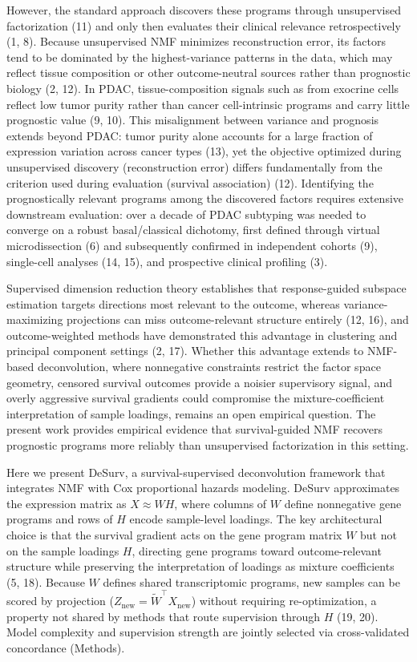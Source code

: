 \documentclass[9pt,twocolumn,twoside,]{pnas-new}
\begin{document}
However, the standard approach discovers these programs through
unsupervised factorization (11) and only then evaluates their clinical
relevance retrospectively (1, 8). Because unsupervised NMF minimizes
reconstruction error, its factors tend to be dominated by the
highest-variance patterns in the data, which may reflect tissue
composition or other outcome-neutral sources rather than prognostic
biology (2, 12). In PDAC, tissue-composition signals such as from
exocrine cells reflect low tumor purity rather than cancer
cell-intrinsic programs and carry little prognostic value (9, 10). This
misalignment between variance and prognosis extends beyond PDAC: tumor
purity alone accounts for a large fraction of expression variation
across cancer types (13), yet the objective optimized during
unsupervised discovery (reconstruction error) differs fundamentally from
the criterion used during evaluation (survival association) (12).
Identifying the prognostically relevant programs among the discovered
factors requires extensive downstream evaluation: over a decade of PDAC
subtyping was needed to converge on a robust basal/classical dichotomy,
first defined through virtual microdissection (6) and subsequently
confirmed in independent cohorts (9), single-cell analyses (14, 15), and
prospective clinical profiling (3).

Supervised dimension reduction theory establishes that response-guided
subspace estimation targets directions most relevant to the outcome,
whereas variance-maximizing projections can miss outcome-relevant
structure entirely (12, 16), and outcome-weighted methods have
demonstrated this advantage in clustering and principal component
settings (2, 17). Whether this advantage extends to NMF-based
deconvolution, where nonnegative constraints restrict the factor space
geometry, censored survival outcomes provide a noisier supervisory
signal, and overly aggressive survival gradients could compromise the
mixture-coefficient interpretation of sample loadings, remains an open
empirical question. The present work provides empirical evidence that
survival-guided NMF recovers prognostic programs more reliably than
unsupervised factorization in this setting.

Here we present DeSurv, a survival-supervised deconvolution framework
that integrates NMF with Cox proportional hazards modeling. DeSurv
approximates the expression matrix as \(X \approx WH\), where columns of
\(W\) define nonnegative gene programs and rows of \(H\) encode
sample-level loadings. The key architectural choice is that the survival
gradient acts on the gene program matrix \(W\) but not on the sample
loadings \(H\), directing gene programs toward outcome-relevant
structure while preserving the interpretation of loadings as mixture
coefficients (5, 18). Because \(W\) defines shared transcriptomic
programs, new samples can be scored by projection
(\(Z_{\text{new}} = \widetilde{W}^\top X_{\text{new}}\)) without
requiring re-optimization, a property not shared by methods that route
supervision through \(H\) (19, 20). Model complexity and supervision
strength are jointly selected via cross-validated concordance (Methods).
\end{document}
